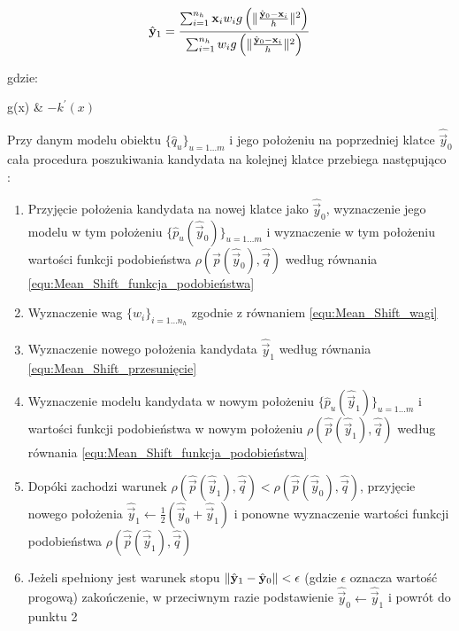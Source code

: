 \begin{equation}
\label{equ:Mean_Shift_przesunięcie}
	\hat{\mathbf{y}}_1 = \frac{\sum_{i=1}^{n_h} \mathbf{x}_i w_i g\left( \lVert\frac{\hat{\mathbf{y}}_0 - \mathbf{x}_i}{h}\rVert^2 \right)}{\sum_{i=1}^{n_h} w_i g\left( \lVert\frac{\hat{\mathbf{y}}_0 - \mathbf{x}_i}{h}\rVert^2 \right)}
\end{equation}

\noindent
gdzie:

\begin{conditionseq}
	g(x) & $-k^\prime(x)$
\end{conditionseq}

Przy danym modelu obiektu $\{\hat{q}_u\}_{u = 1 \dots m}$ i jego położeniu na poprzedniej klatce $\hat{\vec{y}}_0$ cała procedura poszukiwania kandydata na kolejnej klatce przebiega następująco \cite{Comaniciu2003}:

\begin{enumerate}
	\item Przyjęcie położenia kandydata na nowej klatce jako $\hat{\vec{y}}_0$, wyznaczenie jego modelu w tym położeniu $\{\hat{p}_u(\hat{\vec{y}}_0)\}_{u = 1 \dots m}$ i wyznaczenie w tym położeniu wartości funkcji podobieństwa $\rho(\hat{\vec{p}}(\hat{\vec{y}}_0), \hat{\vec{q}})$ według równania \ref{equ:Mean_Shift_funkcja_podobieństwa}
	\item Wyznaczenie wag $\{w_i\}_{i=1 \dots n_h}$ zgodnie z równaniem \ref{equ:Mean_Shift_wagi}
	\item Wyznaczenie nowego położenia kandydata $\hat{\vec{y}}_1$ według równania \ref{equ:Mean_Shift_przesunięcie}
	\item Wyznaczenie modelu kandydata w nowym położeniu $\{\hat{p}_u(\hat{\vec{y}}_1)\}_{u = 1 \dots m}$ i wartości funkcji podobieństwa w nowym położeniu $\rho(\hat{\vec{p}}(\hat{\vec{y}}_1), \hat{\vec{q}})$ według równania \ref{equ:Mean_Shift_funkcja_podobieństwa}
	\item Dopóki zachodzi warunek $\rho(\hat{\vec{p}}(\hat{\vec{y}}_1), \hat{\vec{q}}) < \rho(\hat{\vec{p}}(\hat{\vec{y}}_0), \hat{\vec{q}})$, przyjęcie nowego położenia $\hat{\vec{y}}_1 \leftarrow \frac{1}{2}(\hat{\vec{y}}_0 + \hat{\vec{y}}_1)$ i ponowne wyznaczenie wartości funkcji podobieństwa $\rho(\hat{\vec{p}}(\hat{\vec{y}}_1), \hat{\vec{q}})$
	\item Jeżeli spełniony jest warunek stopu $\lVert\hat{\mathbf{y}}_1 - \hat{\mathbf{y}}_0\rVert < \epsilon$ (gdzie $\epsilon$ oznacza wartość progową) zakończenie, w przeciwnym razie podstawienie $\hat{\vec{y}}_0 \leftarrow \hat{\vec{y}}_1$ i powrót do punktu 2
\end{enumerate}

